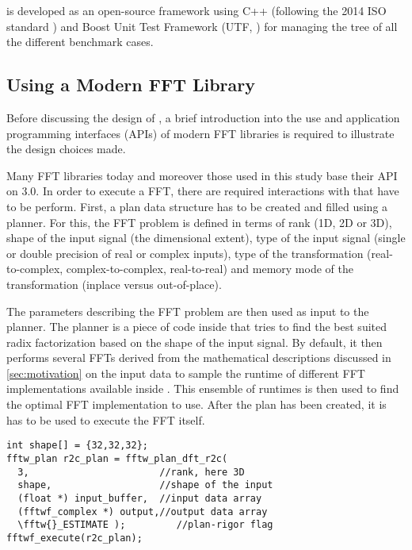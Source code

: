 
\gearshifft{} is developed as an open-source framework using C++ (following the 2014 ISO standard \cite{cpp14std}) and Boost Unit Test Framework (UTF, \cite{boost}) for managing the tree of all the different benchmark cases.

\subsection{Using a Modern FFT Library}
\label{ssec:modern_ffts}

Before discussing the design of \gearshifft{}, a brief introduction into the use and application programming interfaces (APIs) of modern FFT libraries is required to illustrate the design choices made.

Many FFT libraries today and moreover those used in this study base their API on \fftw{} $3.0$. In order to execute a FFT, there are required interactions with \fftw{} that have to be perform. First, a plan data structure has to be created and filled using a planner. For this, the FFT problem is defined in terms of rank (1D, 2D or 3D), shape of the input signal (the dimensional extent), type of the input signal (single or double precision of real or complex inputs), type of the transformation (real-to-complex, complex-to-complex, real-to-real) and memory mode of the transformation (inplace versus out-of-place). 

The parameters describing the FFT problem are then used as input to the planner. The planner is a piece of code inside \fftw{} that tries to find the best suited radix factorization based on the shape of the input signal. By default, it then performs several FFTs derived from the mathematical descriptions discussed in \cref{sec:motivation} on the input data to sample the runtime of different FFT implementations available inside \fftw{}. This ensemble of runtimes is then used to find the optimal FFT implementation to use. After the plan has been created, it is has to be used to execute the FFT itself.

\begin{lstlisting}[caption={Minimal usage example of the \fftw{} single precision real-to-complex planner API. Memory management is omitted.},label={lst:fftw_example}]
int shape[] = {32,32,32};
fftw_plan r2c_plan = fftw_plan_dft_r2c(
  3,                       //rank, here 3D
  shape,                   //shape of the input
  (float *) input_buffer,  //input data array
  (fftwf_complex *) output,//output data array
  \fftw{}_ESTIMATE );         //plan-rigor flag
fftwf_execute(r2c_plan);
\end{lstlisting}

